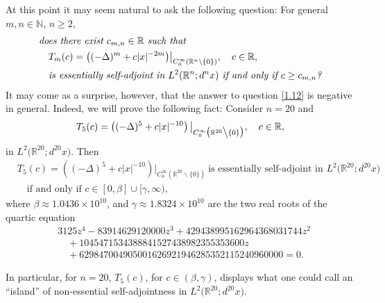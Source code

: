 \documentclass[reqno,11pt,centertags]{amsart}
\newcommand{\bbN}{{\mathbb{N}}}
\newcommand{\bbR}{{\mathbb{R}}}
\newcommand{\<}{\langle}
\renewcommand{\>}{\rangle}
\newcommand{\no}{\nonumber}
\newcommand{\lb}{\label}
\numberwithin{equation}{section}
\theoremstyle{definition}
\begin{document}
At this point it may seem natural to ask the following question: 
For general $m,n\in \bbN$, $n\geq 2$, 
 \begin{align}
\begin{split} 
& \text{\it does there exist $c_{m,n} \in \bbR$ such that} \\ 
& \quad T_m(c) = \big((-\Delta)^m +c|x|^{-2m}\big)\big|_{C_0^{\infty}(\bbR^n \backslash \{0\})},  \quad c \in \bbR, \\
& \quad \text{\it is essentially self-adjoint in $L^2(\bbR^n;d^nx)$ if and only if $c \geq c_{m,n}$?}
\end{split} \lb{1.12}
\end{align}
It may come as a surprise, however, that the answer to question \eqref{1.12} is negative in general. Indeed, we will prove the following fact: Consider $n=20$ and 
\begin{equation}
T_5(c) = \left((-\Delta)^5 +c|x|^{-10}\right)\big|_{C_0^{\infty}\big(\bbR^{20} \big\backslash \{0\}\big)}, \quad c \in \bbR,   
\end{equation}
in $L^2\big(\bbR^{20};d^{20}x\big)$. Then 
\begin{align}
& T_5(c) = \left((-\Delta)^5 +c|x|^{-10}\right)\big|_{C_0^{\infty}(\bbR^{20} \backslash \{0\})}\ \mbox{is essentially self-adjoint  in $L^2\big(\bbR^{20}; d^{20}x\big)$}   \no \\
& \quad \text{if and only if $c \in [0,\beta] \cup [\gamma,\infty)$},     \lb{1.16} 
\end{align}
where $\beta  \approx 1.0436\times 10^{10}$, and $\gamma \approx 1.8324 \times 10^{10}$ are the two real roots of the quartic equation
\begin{align}
&3125 z^4-83914629120000 z^3+429438995162964368031744 z^2     \no \\
&\quad +1045471534388841527438982355353600 z\\  
&\quad +629847004905001626921946285352115240960000 =0.    \no
\end{align}

In particular, for $n=20$, $T_5(c)$, for $c \in (\beta,\gamma)$, displays what one could call an ``island'' of non-essential self-adjointness in $L^2\big(\bbR^{20}; d^{20}x\big)$. 
\end{document}

